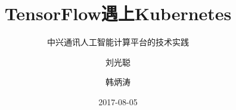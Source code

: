 \title[TensorFlow on Kubernetes]
{TensorFlow遇上Kubernetes}

\subtitle{中兴通讯人工智能计算平台的技术实践}

\author[刘光聪，韩炳涛]
{ 刘光聪 \and 韩炳涛  
}


\date[2017.08]{2017-08-05}
